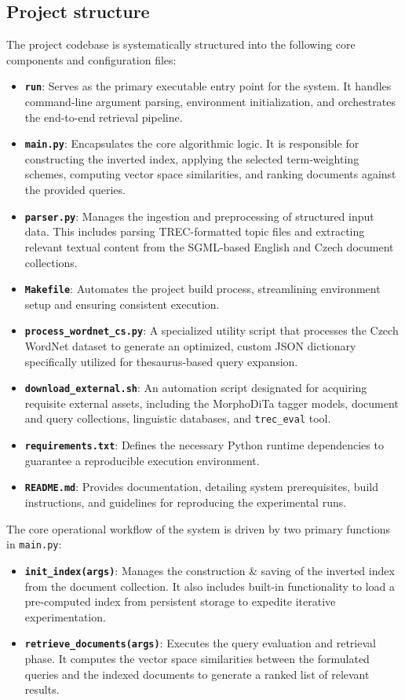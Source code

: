 \documentclass[a4paper, 12pt]{article}
\begin{document}
\subsection{Project structure}

The project codebase is systematically structured into the following core components and configuration files:
\begin{itemize}
    \item \textbf{\texttt{run}}: Serves as the primary executable entry point for the system. It handles command-line argument parsing, environment initialization, and orchestrates the end-to-end retrieval pipeline.
    \item \textbf{\texttt{main.py}}: Encapsulates the core algorithmic logic. It is responsible for constructing the inverted index, applying the selected term-weighting schemes, computing vector space similarities, and ranking documents against the provided queries.
    \item \textbf{\texttt{parser.py}}: Manages the ingestion and preprocessing of structured input data. This includes parsing TREC-formatted topic files and extracting relevant textual content from the SGML-based English and Czech document collections.
    \item \textbf{\texttt{Makefile}}: Automates the project build process, streamlining environment setup and ensuring consistent execution.
    \item \textbf{\texttt{process\_wordnet\_cs.py}}: A specialized utility script that processes the Czech WordNet dataset to generate an optimized, custom JSON dictionary specifically utilized for thesaurus-based query expansion.
    \item \textbf{\texttt{download\_external.sh}}: An automation script designated for acquiring requisite external assets, including the MorphoDiTa tagger models, document and query collections, linguistic databases, and \texttt{trec\_eval} tool.
    \item \textbf{\texttt{requirements.txt}}: Defines the necessary Python runtime dependencies to guarantee a reproducible execution environment.
    \item \textbf{\texttt{README.md}}: Provides documentation, detailing system prerequisites, build instructions, and guidelines for reproducing the experimental runs.
\end{itemize}


\noindent The core operational workflow of the system is driven by two primary functions in \texttt{main.py}:
\begin{itemize}
    \item \textbf{\texttt{init\_index(args)}}: Manages the construction \& saving of the inverted index from the document collection. It also includes built-in functionality to load a pre-computed index from persistent storage to expedite iterative experimentation.
    \item \textbf{\texttt{retrieve\_documents(args)}}: Executes the query evaluation and retrieval phase. It computes the vector space similarities between the formulated queries and the indexed documents to generate a ranked list of relevant results.
\end{itemize}
\end{document}
